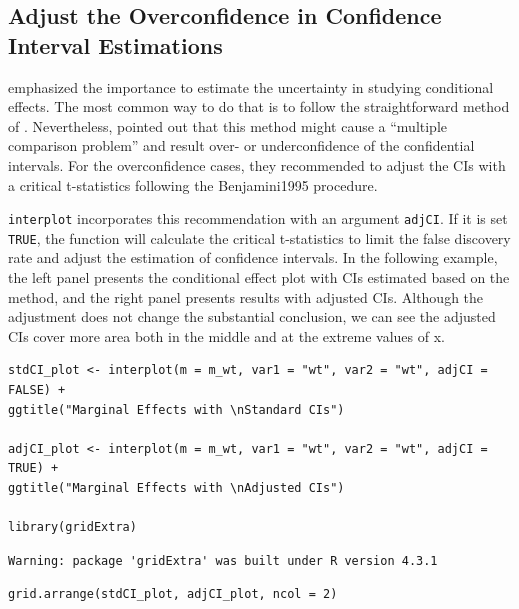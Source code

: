 \documentclass[
  article]{jss}
\begin{document}
\hypertarget{sec-adjust-the-overconfidence-in-confidence-interval-estimations}{%
\subsection{Adjust the Overconfidence in Confidence Interval
Estimations}\label{sec-adjust-the-overconfidence-in-confidence-interval-estimations}}

\citep{BerryDeMerittEsarey2016} emphasized the importance to estimate
the uncertainty in studying conditional effects. The most common way to
do that is to follow the straightforward method of
\citep{BramborClarkGolder2006}. Nevertheless, \citep{EsareySumner2018}
pointed out that this method might cause a ``multiple comparison
problem'' and result over- or underconfidence of the confidential
intervals. For the overconfidence cases, they recommended to adjust the
CIs with a critical t-statistics following the Benjamini1995 procedure.

\texttt{interplot} incorporates this recommendation with an argument
\texttt{adjCI}. If it is set \texttt{TRUE}, the function will calculate
the critical t-statistics to limit the false discovery rate and adjust
the estimation of confidence intervals. In the following example, the
left panel presents the conditional effect plot with CIs estimated based
on the \citep{BramborClarkGolder2006} method, and the right panel
presents results with adjusted CIs. Although the adjustment does not
change the substantial conclusion, we can see the adjusted CIs cover
more area both in the middle and at the extreme values of x.

\begin{verbatim}
stdCI_plot <- interplot(m = m_wt, var1 = "wt", var2 = "wt", adjCI = FALSE) +
ggtitle("Marginal Effects with \nStandard CIs")

adjCI_plot <- interplot(m = m_wt, var1 = "wt", var2 = "wt", adjCI = TRUE) +
ggtitle("Marginal Effects with \nAdjusted CIs")

library(gridExtra)
\end{verbatim}

\begin{verbatim}
Warning: package 'gridExtra' was built under R version 4.3.1
\end{verbatim}

\begin{verbatim}
grid.arrange(stdCI_plot, adjCI_plot, ncol = 2)
\end{verbatim}
\end{document}
